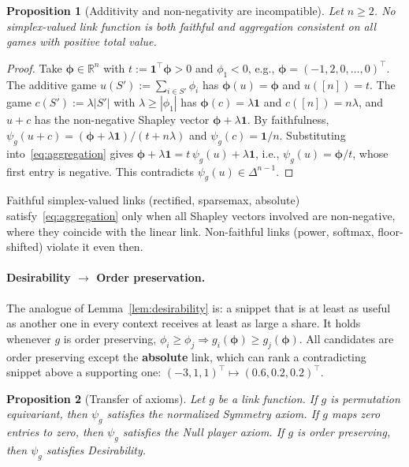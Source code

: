 \documentclass{article}
\newtheorem{proposition}{Proposition}
\begin{document}
\begin{proposition}[Additivity and non-negativity are incompatible]\label{prop:link_impossibility}
Let $n \ge 2$. No simplex-valued link function is both faithful and aggregation consistent on all games with positive total value.
\end{proposition}

\begin{proof}
Take $\boldsymbol{\phi} \in \mathbb{R}^n$ with $t := \mathbf{1}^\top \boldsymbol{\phi} > 0$ and $\phi_1 < 0$, e.g., $\boldsymbol{\phi} = (-1, 2, 0, \dots, 0)^\top$. The additive game $u(S') := \sum_{i \in S'} \phi_i$ has $\boldsymbol{\phi}(u) = \boldsymbol{\phi}$ and $u([n]) = t$. The game $c(S') := \lambda |S'|$ with $\lambda \ge |\phi_1|$ has $\boldsymbol{\phi}(c) = \lambda \mathbf{1}$ and $c([n]) = n\lambda$, and $u + c$ has the non-negative Shapley vector $\boldsymbol{\phi} + \lambda \mathbf{1}$. By faithfulness, $\psi_g(u + c) = (\boldsymbol{\phi} + \lambda \mathbf{1})/(t + n\lambda)$ and $\psi_g(c) = \mathbf{1}/n$. Substituting into~\eqref{eq:aggregation} gives $\boldsymbol{\phi} + \lambda\mathbf{1} = t\, \psi_g(u) + \lambda \mathbf{1}$, i.e., $\psi_g(u) = \boldsymbol{\phi}/t$, whose first entry is negative. This contradicts $\psi_g(u) \in \Delta^{n-1}$.
\end{proof}

Faithful simplex-valued links (rectified, sparsemax, absolute) satisfy~\eqref{eq:aggregation} only when all Shapley vectors involved are non-negative, where they coincide with the linear link. Non-faithful links (power, softmax, floor-shifted) violate it even then.

\paragraph{Desirability $\to$ Order preservation.}
The analogue of Lemma~\ref{lem:desirability} is: a snippet that is at least as useful as another one in every context receives at least as large a share. It holds whenever $g$ is order preserving, $\phi_i \ge \phi_j \Rightarrow g_i(\boldsymbol{\phi}) \ge g_j(\boldsymbol{\phi})$. All candidates are order preserving except the \textbf{absolute} link, which can rank a contradicting snippet above a supporting one: $(-3, 1, 1)^\top \mapsto (0.6, 0.2, 0.2)^\top$.

\begin{proposition}[Transfer of axioms]\label{prop:axiom_transfer}
Let $g$ be a link function. If $g$ is permutation equivariant, then $\psi_g$ satisfies the normalized Symmetry axiom. If $g$ maps zero entries to zero, then $\psi_g$ satisfies the Null player axiom. If $g$ is order preserving, then $\psi_g$ satisfies Desirability.
\end{proposition}
\end{document}
